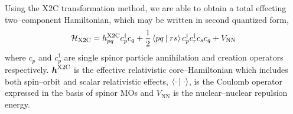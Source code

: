 Using the X2C transformation method, we are able to obtain a total effecting
two--component Hamiltonian, which may be written in second quantized form,
\begin{equation}
\mathcal{H}_\mathrm{X2C} = h_{pq}^\mathrm{X2C}c_p^\dagger c_q + 
  \frac{1}{2} \left\langle pq \left\vert\right. rs \right\rangle c_p^\dagger c_r^\dagger c_s c_q + V_\mathrm{NN}
  \label{eq:X2CHam}
\end{equation}
where $c_p$ and $c_p^\dagger$ are single spinor particle annihilation and
creation operators respectively. $\boldsymbol{h}^\mathrm{X2C}$ is the effective
relativistic core--Hamiltonian which includes both spin--orbit and scalar
relativistic effects, $\left\langle \cdot \left\vert\right. \cdot \right\rangle$, is the Coulomb operator expressed
in the basis of spinor MOs and $V_\mathrm{NN}$ is the nuclear--nuclear repulsion
energy. 
